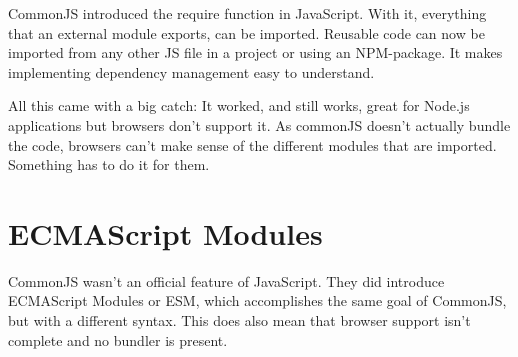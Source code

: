CommonJS introduced the require function in JavaScript. With it, everything that an external module exports, can be imported. Reusable code can now be imported from any other JS file in a project or using an NPM-package. It makes implementing dependency management easy to understand.

All this came with a big catch: It worked, and still works, great for Node.js applications but browsers don’t support it. As commonJS doesn’t actually bundle the code, browsers can’t make sense of the different modules that are imported. Something has to do it for them. 

\section{ECMAScript Modules}
CommonJS wasn’t an official feature of JavaScript. They did introduce ECMAScript Modules or ESM, which accomplishes the same goal of CommonJS, but with a different syntax. This does also mean that browser support isn’t complete and no bundler is present. 
